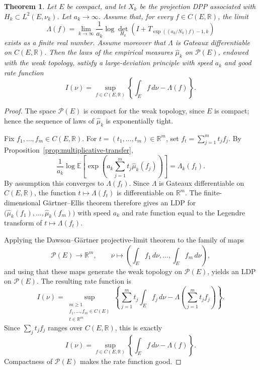 \documentclass[12pt,a4paper,reqno]{article}
\theoremstyle{thmstyleone}
\newtheorem{theorem}{Theorem}[subsection]
\theoremstyle{thmstylethree}
\theoremstyle{thmstyletwo}
\numberwithin{equation}{subsection}
\def\geq{\geqslant}
\begin{document}
\begin{theorem}\label{thm:ldp-transfer}
Let $E$ be compact, and let $X_k$ be the projection DPP associated with $H_k\subset L^2(E,\nu_k)$. Let $a_k\to\infty$. Assume that, for every $f\in C(E,\mathbb R)$, the limit
\begin{equation}\label{eq:46}
\Lambda(f)
=
\lim_{k\to\infty}
\frac{1}{a_k}
\log
\det_{H_k}
\left(
I+
T_{\exp((a_k/N_k)f)-1,k}
\right)
\end{equation}
exists as a finite real number. Assume moreover that $\Lambda$ is Gateaux differentiable on $C(E,\mathbb R)$. Then the laws of the empirical measures $\widehat\mu_k$ on $\mathcal P(E)$, endowed with the weak topology, satisfy a large-deviation principle with speed $a_k$ and good rate function
\[
I(\nu)
=
\sup_{f\in C(E,\mathbb R)}
\left\{
\int_E f\,d\nu-\Lambda(f)
\right\}.
\]
\end{theorem}

\begin{proof}
The space $\mathcal P(E)$ is compact for the weak topology, since $E$ is compact; hence the sequence of laws of $\widehat\mu_k$ is exponentially tight.

Fix $f_1,\ldots,f_m\in C(E,\mathbb R)$. For $t=(t_1,\ldots,t_m)\in\mathbb R^m$, set $f_t=\sum_{j=1}^m t_jf_j$. By Proposition~\ref{prop:multiplicative-transfer},
\[
\frac{1}{a_k}
\log
\mathbb E
\left[
\exp\left(
a_k\sum_{j=1}^m t_j\widehat\mu_k(f_j)
\right)
\right]
=
\Lambda_k(f_t).
\]
By assumption this converges to $\Lambda(f_t)$. Since $\Lambda$ is Gateaux differentiable on $C(E,\mathbb R)$, the function $t\longmapsto \Lambda(f_t)$ is differentiable on $\mathbb R^m$. The finite-dimensional G\"artner--Ellis theorem \cite[Thm.~2.3.6]{DZ} therefore gives an LDP for $\bigl(\widehat\mu_k(f_1),\ldots,\widehat\mu_k(f_m)\bigr)$ with speed $a_k$ and rate function equal to the Legendre transform of $t\mapsto\Lambda(f_t)$.

Applying the Dawson--G\"artner projective-limit theorem \cite[Thm.~4.6.1]{DZ} to the family of maps
\[
\mathcal P(E)\longrightarrow\mathbb R^m,\qquad
\nu\longmapsto \left(\int_E f_1\,d\nu,\ldots,\int_E f_m\,d\nu\right),
\]
and using that these maps generate the weak topology on $\mathcal P(E)$, yields an LDP on $\mathcal P(E)$. The resulting rate function is
\[
I(\nu)
=
\sup_{\substack{m\geq1\\ f_1,\ldots,f_m\in C(E)\\ t\in\mathbb R^m}}
\left\{
\sum_{j=1}^m t_j\int_E f_j\,d\nu
-
\Lambda\left(\sum_{j=1}^m t_jf_j\right)
\right\}.
\]
Since $\sum_jt_jf_j$ ranges over $C(E,\mathbb R)$, this is exactly
\[
I(\nu)
=
\sup_{f\in C(E,\mathbb R)}
\left\{
\int_E f\,d\nu-\Lambda(f)
\right\}.
\]
Compactness of $\mathcal P(E)$ makes the rate function good.
\end{proof}
\end{document}
